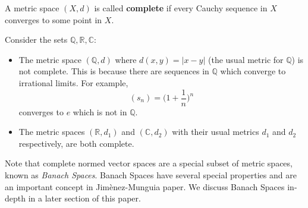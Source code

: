 \begin{defn}
A metric space $(X, d)$ is called \textbf{complete} if every Cauchy sequence in $X$ converges to some point in $X$.
\end{defn}

\begin{example}
Consider the sets $\mathbb{Q}, \mathbb{R}, \mathbb{C}$:
\begin{itemize}
\item The metric space $(\mathbb{Q}, d)$ where $d(x,y) = |x - y|$ (the usual metric for $\mathbb{Q}$) is not complete.  This is because there are sequences in $\mathbb{Q}$ which converge to irrational limits.  For example, 
\[(s_n) = \biggl ( 1 + \frac{1}{n} \biggr )^n\]
converges to $e$ which is not in $\mathbb{Q}$.

\item The metric spaces $(\mathbb{R}, d_1)$ and $(\mathbb{C}, d_2)$ with their usual metrics $d_1$ and $d_2$ respectively, are both complete.
\end{itemize}
\end{example}

Note that complete normed vector spaces are a special subset of metric spaces, known as \textit{Banach Spaces}.  Banach Spaces have several special properties and are an important concept in Jim{\`e}nez-Munguia \etals paper.  We discuss Banach Spaces in-depth in a later section of this paper.